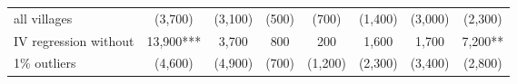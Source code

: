 \begin{table}[H]
{\begin{tabular}{lccccccc}
\hspace{1em}\hspace{1em}all villages & (3,700) & (3,100) & (500) & (700) & (1,400) & (3,000) & (2,300)\\
\hspace{1em}IV regression without & 13,900*** & 3,700 & 800 & 200 & 1,600 & 1,700 & 7,200**\\
\hspace{1em}\hspace{1em} 1\% outliers & (4,600) & (4,900) & (700) & (1,200) & (2,300) & (3,400) & (2,800)\\
\bottomrule
\end{tabular}}
\end{table}
